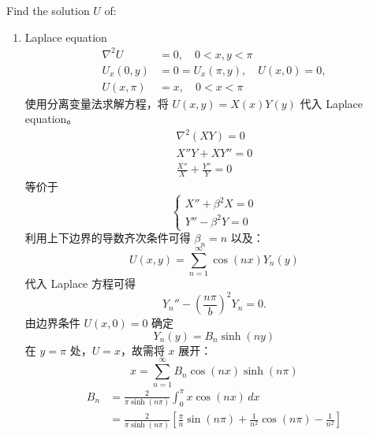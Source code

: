 \documentclass[a4paper]{article}
\begin{document}
    Find the solution \(U\) of:

    \begin{enumerate}
    \item[(a)] Laplace equation
        \begin{align*}
            \nabla^2 U &= 0, \quad 0 < x, y < \pi \\
            U_x(0, y) &= 0 = U_x(\pi, y), \quad U(x, 0) = 0, \\
            U(x, \pi) &= x, \quad 0 < x < \pi
        \end{align*}
        使用分离变量法求解方程，将 \(U(x, y) = X(x)Y(y)\) 代入 Laplace equation。
        \begin{gather*}
            \nabla^2 (XY) = 0 \\
            X''Y + XY'' = 0\\
            \frac{X''}{X} + \frac{Y''}{Y} = 0
        \end{gather*}
        等价于
        \begin{equation*}
            \begin{cases}
                X'' + \beta^2 X = 0 \\
                Y'' - \beta^2 Y = 0
            \end{cases}
        \end{equation*}
        利用上下边界的导数齐次条件可得 $\beta_n = n$ 以及：
        \begin{equation*}
            U(x,y)=\sum_{n=1}^{\infty}\cos\!\left(n x\right)
            Y_n(y)
        \end{equation*}
        代入 Laplace 方程可得
        \begin{equation*}
            Y_n''-\left(\frac{n\pi}{b}\right)^2Y_n=0.
        \end{equation*}
        由边界条件 $U(x,0)=0$ 确定 
        \begin{equation*}
            Y_n(y) = B_n \sinh\left( n y\right)
        \end{equation*}
        在 $y=\pi$ 处，$U=x$，故需将 $x$ 展开：
        \begin{equation*}
            x = \sum_{n=1}^{\infty} B_n \cos(nx) \sinh\left(n \pi\right)
        \end{equation*}
        \begin{equation*}
            \begin{aligned}
                B_n &= \frac{2}{\pi\sinh(n \pi)}\int_0^\pi x \cos(nx) \, dx \\
                &= \frac{2}{\pi\sinh(n \pi)}\left[\frac{\pi}{n}\sin(n \pi) + \frac{1}{n^2}\cos(n \pi) - \frac{1}{n^2}\right] \\

\end{aligned}
\end{equation*}
\end{enumerate}
\end{document}
